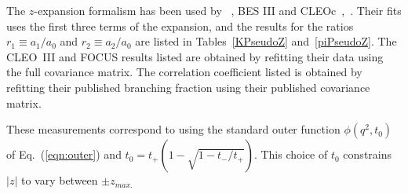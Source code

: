 \begin{table}[htbp]
\begin{center}
\begin{tabular}{cccc}
\vspace*{-10pt} & \\
\hline
\end{tabular}
\end{center}
\end{table}

The $z$-expansion formalism has been used by \babar~\cite{Aubert:2007wg}\cite{babar-new}, 
BES III\cite{BESIII-new} and CLEOc~\cite{Besson:2009uv},~\cite{Dobbs:2007aa}.
Their fits uses the first three terms of the expansion, %
and the results for the ratios $r_1\equiv a_1/a_0$ and $r_2\equiv a_2/a_0$ are 
listed in Tables~\ref{KPseudoZ} and~\ref{piPseudoZ}. 
The CLEO~III\cite{Huang:2004fra} and FOCUS\cite{Link:2004dh} results 
listed are obtained by refitting their data using the full
covariance matrix. The \babar correlation coefficient listed is 
obtained by refitting their published branching fraction using 
their published covariance matrix.  

These measurements correspond to using the standard 
outer function $\phi(q^2,t_0)$ of Eq.~(\ref{eqn:outer}) and 
$t_0=t_+\left(1-\sqrt{1-t_-/t_+}\right)$. This choice of $t^{}_0$
constrains $|z|$ to vary between $\pm z_{max.}$

